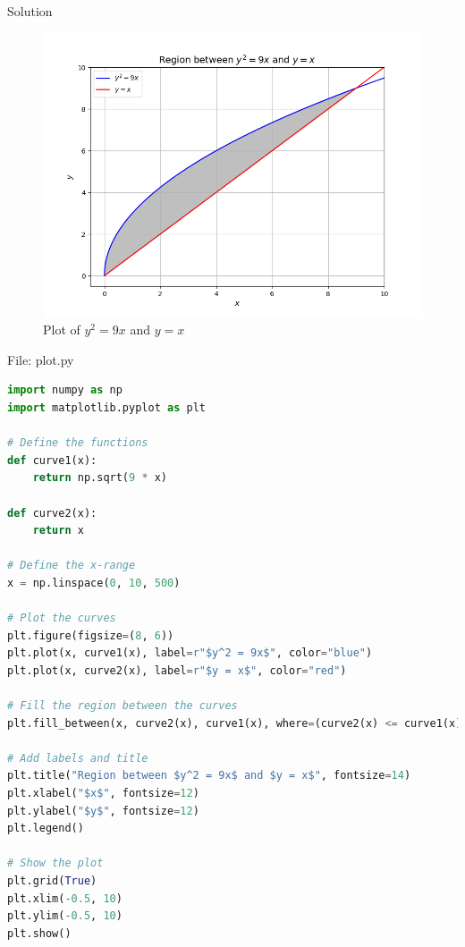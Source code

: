 \documentclass{beamer}
\numberwithin{equation}{section}
\theoremstyle{remark}
\begin{document}
\begin{frame}{Solution}
\begin{figure}[h!]
   \centering
   \includegraphics[width=0.85\linewidth]{figs/01.png}
   \caption{Plot of $y^2 = 9x$ and $y = x$}
   \label{Plot_1}
\end{figure}
\end{frame}
\begin{frame}[fragile]{File: plot.py}
\begin{lstlisting}[language=Python]
import numpy as np
import matplotlib.pyplot as plt

# Define the functions
def curve1(x):
    return np.sqrt(9 * x)

def curve2(x):
    return x

# Define the x-range
x = np.linspace(0, 10, 500)

# Plot the curves
plt.figure(figsize=(8, 6))
plt.plot(x, curve1(x), label=r"$y^2 = 9x$", color="blue")
plt.plot(x, curve2(x), label=r"$y = x$", color="red")

# Fill the region between the curves
plt.fill_between(x, curve2(x), curve1(x), where=(curve2(x) <= curve1(x)), color="gray", alpha=0.5)

# Add labels and title
plt.title("Region between $y^2 = 9x$ and $y = x$", fontsize=14)
plt.xlabel("$x$", fontsize=12)
plt.ylabel("$y$", fontsize=12)
plt.legend()

# Show the plot
plt.grid(True)
plt.xlim(-0.5, 10)
plt.ylim(-0.5, 10)
plt.show()
\end{lstlisting}
\end{frame}
\end{document}
